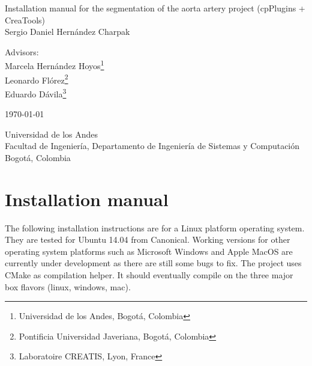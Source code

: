 \documentclass[12pt]{article}
\begin{document}
\begin{center}
\begin{figure}
\centering%
%
\end{figure}
\vspace{3 cm}
\FloatBarrier


\begin{center}
\Huge
Installation manual for the segmentation of the aorta artery project (cpPlugins + CreaTools)
\\  
\vspace{1 cm}
\Large Sergio Daniel Hern\'{a}ndez Charpak

\large

\vspace{1cm}
\Large
Advisors:\\
Marcela Hernández Hoyos\footnote{Universidad de los Andes, Bogot\'{a}, Colombia}\\
Leonardo Fl\'{o}rez\footnote{Pontificia Universidad Javeriana, Bogot\'{a}, Colombia}\\
Eduardo D\'{a}vila\footnote{Laboratoire CREATIS, Lyon, France}\\


\normalsize
\vspace{1cm}

\today

\vspace{1 cm}
\small 
Universidad de los Andes\\
Facultad de Ingenier\'{i}a, Departamento de Ingenier\'{i}a de Sistemas y Computaci\'{o}n\\
Bogot\'{a}, Colombia\\
\end{center}


\normalsize
\end{center}

\newpage

\section{Installation manual}

The following installation instructions are for a Linux platform operating system. They are
tested for Ubuntu 14.04 from Canonical. Working versions for other operating system platforms
such as Microsoft Windows and Apple MacOS are currently under development as there are still some bugs
to fix. The project uses CMake as compilation helper. It should eventually compile on the three major
box flavors (linux, windows, mac).
\end{document}

